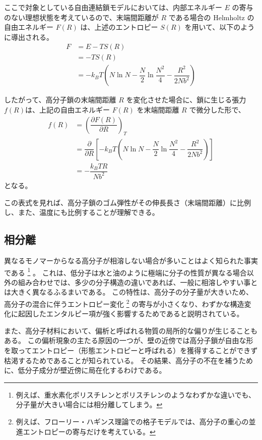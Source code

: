 \documentclass[uplatex,dvipdfmx,a4paper,11pt, titlepage]{jsarticle}
\begin{document}
ここで対象としている自由連結鎖モデルにおいては、内部エネルギー $E$ の寄与のない理想状態を考えているので、末端間距離が $R$ である場合の Helmholtz の自由エネルギー $F(R)$ は、上述のエントロピー $S(R)$ を用いて、以下のように導出される。
\begin{align*}
F 	&= E - TS(R) \\
	&= -TS(R) \\
	&= -k_B T \left( N\ln N - \dfrac{N}{2} \ln \dfrac{N^2}{4} - \dfrac{R^2}{2Nb^2} \right) 
\end{align*}

したがって、高分子鎖の末端間距離 $R$ を変化させた場合に、鎖に生じる張力 $f(R)$は、上記の自由エネルギー $F(R)$ を末端間距離 $R$ で微分した形で、
\begin{align*}
f(R) 	
&= \left(\dfrac{\partial F(R)}{\partial R} \right)_T \\
	&=\dfrac{\partial}{\partial R} \left[ -k_B T \left( N\ln N - \dfrac{N}{2} \ln \dfrac{N^2}{4} - \dfrac{R^2}{2Nb^2} \right) \right]\\
	&=- \dfrac{k_B T R}{Nb^2}
\end{align*}
となる。

この表式を見れば、高分子鎖のゴム弾性がその伸長長さ（末端間距離）に比例し、また、温度にも比例することが理解できる。


\subsection{相分離}

異なるモノマーからなる高分子が相溶しない場合が多いことはよく知られた事実である
\footnote{
例えば、重水素化ポリスチレンとポリスチレンのようなわずかな違いでも、分子量が大きい場合には相分離してしまう。
}
。
これは、低分子は水と油のように極端に分子の性質が異なる場合以外の組み合わせでは、多少の分子構造の違いであれば、一般に相溶しやすい事とは大きく異なるふるまいである。
この特性は、高分子の分子量が大きいため、高分子の混合に伴うエントロピー変化
\footnote
{
例えば、フローリー・ハギンス理論での格子モデルでは、高分子の重心の並進エントロピーの寄与だけを考えている。
}
の寄与が小さくなり、わずかな構造変化に起因したエンタルピー項が強く影響するためであると説明されている。


また、高分子材料において、偏析と呼ばれる物質の局所的な偏りが生じることもある。
この偏析現象の主たる原因の一つが、壁の近傍では高分子鎖が自由な形を取ってエントロピー（形態エントロピーと呼ばれる）を獲得することができず枯渇するためであることが知られている。
その結果、高分子の不在を補うために、低分子成分が壁近傍に局在化するわけである。
\end{document}
